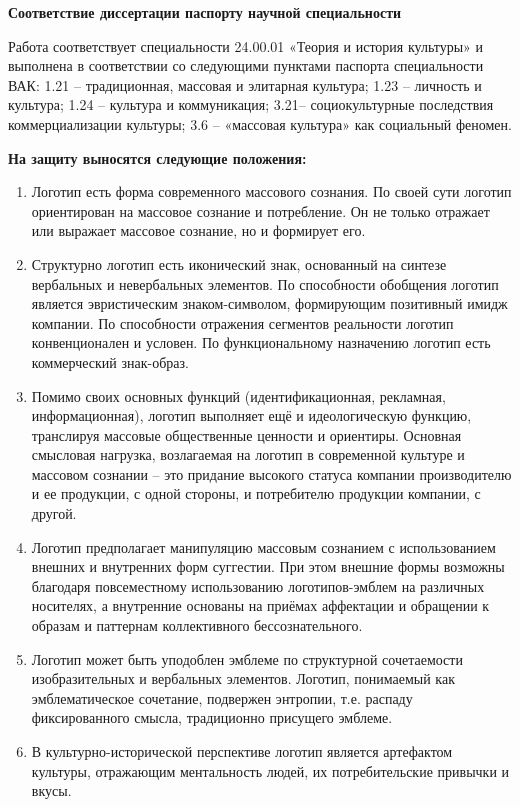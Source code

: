 \textbf{Соответствие диссертации паспорту научной специальности}

Работа соответствует специальности 24.00.01 «Теория и история культуры» и выполнена в соответствии со следующими пунктами паспорта специальности ВАК: 1.21 – традиционная, массовая и элитарная культура; 1.23 – личность и культура; 1.24 – культура и коммуникация; 3.21– социокультурные последствия коммерциализации культуры; 3.6 – «массовая культура» как социальный феномен.

\textbf{На защиту выносятся следующие положения:}
\begin{enumerate}
\item Логотип есть форма современного массового сознания. По своей сути логотип ориентирован на массовое сознание и потребление. Он не только отражает или выражает массовое сознание, но и формирует его.
\item Структурно логотип есть иконический знак, основанный на синтезе вербальных и невербальных элементов. По способности обобщения логотип является эвристическим знаком-символом, формирующим позитивный имидж компании. По способности отражения сегментов реальности логотип конвенционален и условен. По функциональному назначению логотип есть коммерческий знак-образ.
\item Помимо своих основных функций (идентификационная, рекламная, информационная), логотип выполняет ещё и идеологическую функцию, транслируя массовые общественные ценности и ориентиры. Основная смысловая нагрузка, возлагаемая на логотип в современной культуре и массовом сознании – это придание высокого статуса компании производителю и ее продукции, с одной стороны, и потребителю продукции компании, с другой.
\item Логотип предполагает манипуляцию массовым сознанием с использованием внешних и внутренних форм суггестии. При этом внешние формы возможны благодаря повсеместному использованию логотипов-эмблем на различных носителях, а внутренние основаны на приёмах аффектации и обращении к образам и паттернам коллективного бессознательного.
\item Логотип может быть уподоблен эмблеме по структурной сочетаемости изобразительных и вербальных элементов. Логотип, понимаемый как эмблематическое сочетание, подвержен энтропии, т.е. распаду фиксированного смысла, традиционно присущего эмблеме.
\item В культурно-исторической перспективе логотип является артефактом культуры, отражающим ментальность людей, их потребительские привычки и вкусы.
\end{enumerate}

